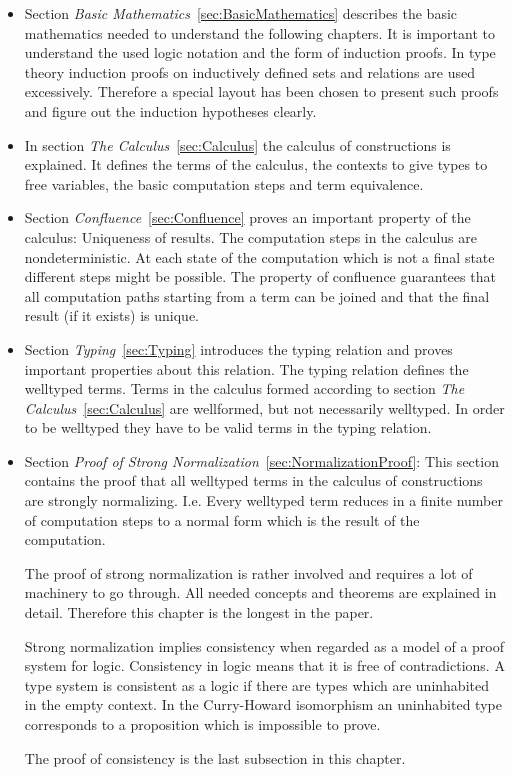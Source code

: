 \begin{itemize}

\item Section \emph{Basic Mathematics}~\ref{sec:BasicMathematics} describes the
basic mathematics needed to understand the following chapters. It is important
to understand the used logic notation and the form of induction proofs. In type
theory induction proofs on inductively defined sets and relations are used
excessively. Therefore a special layout has been chosen to present such proofs
and figure out the induction hypotheses clearly.

\item In section \emph{The Calculus}~\ref{sec:Calculus} the calculus of
constructions is explained. It defines the terms of the calculus, the contexts
to give types to free variables, the basic computation steps and term
equivalence.


\item Section \emph{Confluence}~\ref{sec:Confluence} proves an important
property of the calculus: Uniqueness of results. The computation steps in the
calculus are nondeterministic. At each state of the computation which is not a
final state different steps might be possible. The property of confluence
guarantees that all computation paths starting from a term can be joined and
that the final result (if it exists) is unique.

\item Section \emph{Typing}~\ref{sec:Typing} introduces the typing relation and
proves important properties about this relation. The typing relation defines the
welltyped terms. Terms in the calculus formed according to section \emph{The
Calculus}~\ref{sec:Calculus} are wellformed, but not necessarily welltyped. In
order to be welltyped they have to be valid terms in the typing relation.


\item Section \emph{Proof of Strong Normalization}~\ref{sec:NormalizationProof}:
This section contains the proof that all welltyped terms in the calculus of
constructions are strongly normalizing. I.e. Every welltyped term reduces in a
finite number of computation steps to a normal form which is the result of the
computation.

The proof of strong normalization is rather involved and requires a lot of
machinery to go through. All needed concepts and theorems are explained in
detail. Therefore this chapter is the longest in the paper.

Strong normalization implies consistency when regarded
as a model of a proof system for logic. Consistency in logic means that it is
free of contradictions. A type system is consistent as a logic if there are
types which are uninhabited in the empty context. In the Curry-Howard
isomorphism an uninhabited type corresponds to a proposition which is
impossible to prove.

The proof of consistency is the last subsection in this chapter.

\end{itemize}

